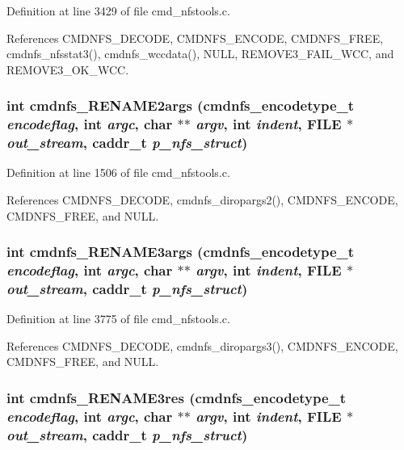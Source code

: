 Definition at line 3429 of file cmd\_\-nfstools.c.

References CMDNFS\_\-DECODE, CMDNFS\_\-ENCODE, CMDNFS\_\-FREE, cmdnfs\_\-nfsstat3(), cmdnfs\_\-wccdata(), NULL, REMOVE3\_\-FAIL\_\-WCC, and REMOVE3\_\-OK\_\-WCC.
\subsubsection{\setlength{\rightskip}{0pt plus 5cm}int cmdnfs\_\-RENAME2args ({\bf cmdnfs\_\-encodetype\_\-t} {\em encodeflag}, int {\em argc}, char $\ast$$\ast$ {\em argv}, int {\em indent}, FILE $\ast$ {\em out\_\-stream}, caddr\_\-t {\em p\_\-nfs\_\-struct})}\label{cmd__nfstools_8c_a80}




Definition at line 1506 of file cmd\_\-nfstools.c.

References CMDNFS\_\-DECODE, cmdnfs\_\-diropargs2(), CMDNFS\_\-ENCODE, CMDNFS\_\-FREE, and NULL.
\subsubsection{\setlength{\rightskip}{0pt plus 5cm}int cmdnfs\_\-RENAME3args ({\bf cmdnfs\_\-encodetype\_\-t} {\em encodeflag}, int {\em argc}, char $\ast$$\ast$ {\em argv}, int {\em indent}, FILE $\ast$ {\em out\_\-stream}, caddr\_\-t {\em p\_\-nfs\_\-struct})}\label{cmd__nfstools_8c_a111}




Definition at line 3775 of file cmd\_\-nfstools.c.

References CMDNFS\_\-DECODE, cmdnfs\_\-diropargs3(), CMDNFS\_\-ENCODE, CMDNFS\_\-FREE, and NULL.
\subsubsection{\setlength{\rightskip}{0pt plus 5cm}int cmdnfs\_\-RENAME3res ({\bf cmdnfs\_\-encodetype\_\-t} {\em encodeflag}, int {\em argc}, char $\ast$$\ast$ {\em argv}, int {\em indent}, FILE $\ast$ {\em out\_\-stream}, caddr\_\-t {\em p\_\-nfs\_\-struct})}\label{cmd__nfstools_8c_a112}




